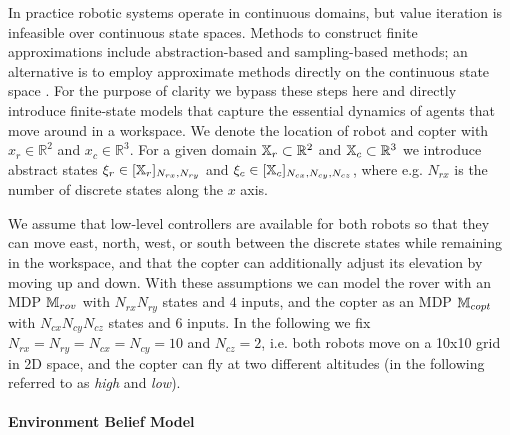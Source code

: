 \documentclass[conference]{IEEEtran}
\renewcommand{\cite}[1]{\citep{#1}}
\begin{document}
In practice robotic systems operate in continuous domains, but value iteration is infeasible over continuous state spaces. Methods to construct finite approximations include abstraction-based \cite{Zamani2015} and sampling-based \cite{Kavraki1996, Agha-mohammadi2014} methods; an alternative is to employ approximate methods directly on the continuous state space \cite{Powell2011}. For the purpose of clarity we bypass these steps here and directly introduce finite-state models that capture the essential dynamics of agents that move around in a workspace. We denote the location of robot and copter with $x_r \in \mathbb{R}^2$ and $x_c \in \mathbb{R}^3$. For a given domain $\mathbb{X}_r \subset \mathbb{R}^2$ and $\mathbb{X}_c \subset \mathbb{R}^3$ we introduce abstract states $\xi_r \in [\mathbb{X}_r]_{N_{rx}, N_{ry}}$ and $\xi_c \in [\mathbb{X}_c]_{N_{cx}, N_{cy}, N_{cz}}$, where e.g. $N_{rx}$ is the number of discrete states along the $x$ axis.

We assume that low-level controllers are available for both robots so that they can move east, north, west, or south between the discrete states while remaining in the workspace, and that the copter can additionally adjust its elevation by moving up and down. With these assumptions we can model the rover with an MDP $\mathbb{M}_{rov}$ with $N_{rx} N_{ry}$ states and $4$ inputs, and the copter as an MDP $\mathbb{M}_{copt}$ with $N_{cx} N_{cy} N_{cz}$ states and $6$ inputs. In the following we fix $N_{rx} = N_{ry} = N_{cx} = N_{cy} = 10$ and $N_{cz} = 2$, i.e. both robots move on a 10x10 grid in 2D space, and the copter can fly at two different altitudes (in the following referred to as \emph{high} and \emph{low}).


\paragraph{Environment Belief Model}
\end{document}
